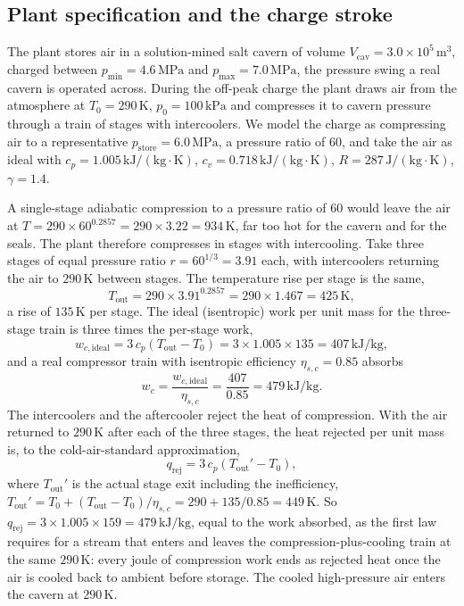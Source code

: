 

\subsection{Plant specification and the charge stroke}

The plant stores air in a solution-mined salt cavern of volume
$V_{\text{cav}} = 3.0 \times 10^5\,\text{m}^3$, charged between
$p_{\min} = 4.6\,\text{MPa}$ and $p_{\max} = 7.0\,\text{MPa}$, the
pressure swing a real cavern is operated across. During the off-peak
charge the plant draws air from the atmosphere at $T_0 = 290\,\si{\kelvin}$,
$p_0 = 100\,\text{kPa}$ and compresses it to cavern pressure through a
train of stages with intercoolers. We model the charge as compressing air
to a representative $p_{\text{store}} = 6.0\,\text{MPa}$, a pressure ratio
of $60$, and take the air as ideal with $c_p = 1.005\,\text{kJ}/(\text{kg}
\cdot\si{\kelvin})$, $c_v = 0.718\,\text{kJ}/(\text{kg}\cdot\si{\kelvin})$,
$R = 287\,\text{J}/(\text{kg}\cdot\si{\kelvin})$, $\gamma = 1.4$.

A single-stage adiabatic compression to a pressure ratio of $60$ would
leave the air at $T = 290 \times 60^{0.2857} = 290 \times 3.22 =
934\,\si{\kelvin}$, far too hot for the cavern and for the seals. The
plant therefore compresses in stages with intercooling. Take three stages
of equal pressure ratio $r = 60^{1/3} = 3.91$ each, with intercoolers
returning the air to $290\,\si{\kelvin}$ between stages. The temperature
rise per stage is the same,
\[
T_{\text{out}} = 290 \times 3.91^{0.2857} = 290 \times 1.467 =
425\,\si{\kelvin},
\]
a rise of $135\,\si{\kelvin}$ per stage. The ideal (isentropic) work per
unit mass for the three-stage train is three times the per-stage work,
\[
w_{c,\text{ideal}} = 3\,c_p (T_{\text{out}} - T_0)
  = 3 \times 1.005 \times 135 = 407\,\text{kJ}/\text{kg},
\]
and a real compressor train with isentropic efficiency
$\eta_{s,c} = 0.85$ absorbs
\[
w_c = \frac{w_{c,\text{ideal}}}{\eta_{s,c}}
  = \frac{407}{0.85} = 479\,\text{kJ}/\text{kg}.
\]
The intercoolers and the aftercooler reject the heat of compression. With
the air returned to $290\,\si{\kelvin}$ after each of the three stages,
the heat rejected per unit mass is, to the cold-air-standard approximation,
\[
q_{\text{rej}} = 3\,c_p (T_{\text{out}}' - T_0),
\]
where $T_{\text{out}}'$ is the actual stage exit including the
inefficiency, $T_{\text{out}}' = T_0 + (T_{\text{out}} - T_0)/\eta_{s,c}
= 290 + 135/0.85 = 449\,\si{\kelvin}$. So $q_{\text{rej}} = 3 \times
1.005 \times 159 = 479\,\text{kJ}/\text{kg}$, equal to the work absorbed,
as the first law requires for a stream that enters and leaves the
compression-plus-cooling train at the same $290\,\si{\kelvin}$: every
joule of compression work ends as rejected heat once the air is cooled
back to ambient before storage. The cooled high-pressure air enters the
cavern at $290\,\si{\kelvin}$.

